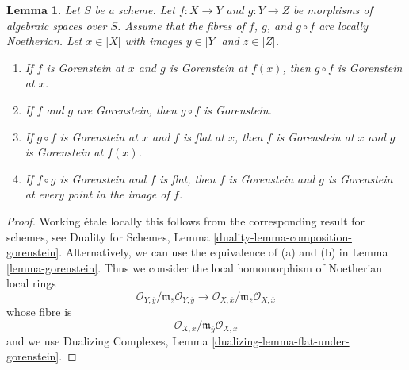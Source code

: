 \documentclass[10pt,a4paper]{amsart}
\theoremstyle{plain}
\newtheorem{lemma}[subsection]{Lemma}
\theoremstyle{definition}
\theoremstyle{remark}
\numberwithin{equation}{subsection}
\begin{document}
\begin{lemma}
\label{lemma-composition-gorenstein}
Let $S$ be a scheme.
Let $f : X \to Y$ and $g : Y \to Z$ be morphisms of algebraic spaces
over $S$. Assume that the
fibres of $f$, $g$, and $g \circ f$ are locally Noetherian.
Let $x \in |X|$ with images $y \in |Y|$ and $z \in |Z|$.
\begin{enumerate}
\item If $f$ is Gorenstein at $x$ and $g$ is Gorenstein
at $f(x)$, then $g \circ f$ is Gorenstein at $x$.
\item If $f$ and $g$ are Gorenstein, then $g \circ f$ is Gorenstein.
\item If $g \circ f$ is Gorenstein at $x$ and $f$ is flat at $x$,
then $f$ is Gorenstein at $x$ and $g$ is Gorenstein at $f(x)$.
\item If $f \circ g$ is Gorenstein and $f$ is flat, then
$f$ is Gorenstein and $g$ is Gorenstein at every point in
the image of $f$.
\end{enumerate}
\end{lemma}

\begin{proof}
Working \'etale locally this follows from the corresponding result for
schemes, see Duality for Schemes, Lemma
\ref{duality-lemma-composition-gorenstein}.
Alternatively, we can use the equivalence of (a) and (b) in
Lemma \ref{lemma-gorenstein}. Thus we consider the local homomorphism
of Noetherian local rings
$$
\mathcal{O}_{Y, \overline{y}}/
\mathfrak m_{\overline{z}}\mathcal{O}_{Y, \overline{y}}
\longrightarrow
\mathcal{O}_{X, \overline{x}}/
\mathfrak m_{\overline{z}}\mathcal{O}_{X, \overline{x}}
$$
whose fibre is
$$
\mathcal{O}_{X, \overline{x}}/
\mathfrak m_{\overline{y}}\mathcal{O}_{X, \overline{x}}
$$
and we use Dualizing Complexes, Lemma
\ref{dualizing-lemma-flat-under-gorenstein}.
\end{proof}
\end{document}
